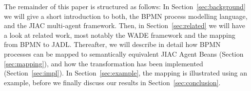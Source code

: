 
The remainder of this paper is structured as follows: In Section~\ref{sec:background}
we will give a short introduction to both, the BPMN process modelling language,
and the JIAC multi-agent framework.  Then, in Section~\ref{sec:related} we will
have a look at related work, most notably the WADE framework and the mapping from
BPMN to JADL.  Thereafter, we will describe in detail how BPMN processes can be
mapped to semantically equivalent JIAC Agent Beans (Section \ref{sec:mapping}),
and how the transformation has been implemented (Section~\ref{sec:impl}).
In Section~\ref{sec:example}, the mapping is illustrated using an example,
before we finally discuss our results in Section~\ref{sec:conclusion}.

